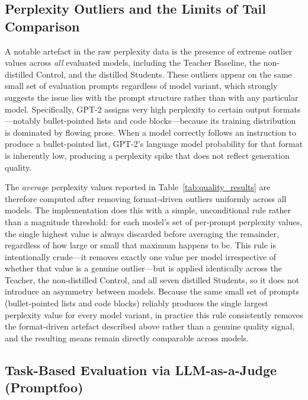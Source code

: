 \documentclass[11pt, a4paper]{article}
\begin{document}
\subsection{Perplexity Outliers and the Limits of Tail Comparison}
\label{subsec:ppl_outliers}

A notable artefact in the raw perplexity data is the presence of extreme outlier values across \emph{all} evaluated models, including the Teacher Baseline, the non-distilled Control, and the distilled Students. These outliers appear on the same small set of evaluation prompts regardless of model variant, which strongly suggests the issue lies with the prompt structure rather than with any particular model. Specifically, GPT-2 assigns very high perplexity to certain output formats---notably bullet-pointed lists and code blocks---because its training distribution is dominated by flowing prose. When a model correctly follows an instruction to produce a bullet-pointed list, GPT-2's language model probability for that format is inherently low, producing a perplexity spike that does not reflect generation quality.

The \emph{average} perplexity values reported in Table~\ref{tab:quality_results} are therefore computed after removing format-driven outliers uniformly across all models. The implementation does this with a simple, unconditional rule rather than a magnitude threshold: for each model's set of per-prompt perplexity values, the single highest value is always discarded before averaging the remainder, regardless of how large or small that maximum happens to be. This rule is intentionally crude---it removes exactly one value per model irrespective of whether that value is a genuine outlier---but is applied identically across the Teacher, the non-distilled Control, and all seven distilled Students, so it does not introduce an asymmetry between models. Because the same small set of prompts (bullet-pointed lists and code blocks) reliably produces the single largest perplexity value for every model variant, in practice this rule consistently removes the format-driven artefact described above rather than a genuine quality signal, and the resulting means remain directly comparable across models.

\subsection{Task-Based Evaluation via LLM-as-a-Judge (Promptfoo)}
\label{subsec:promptfoo_results}
\end{document}
